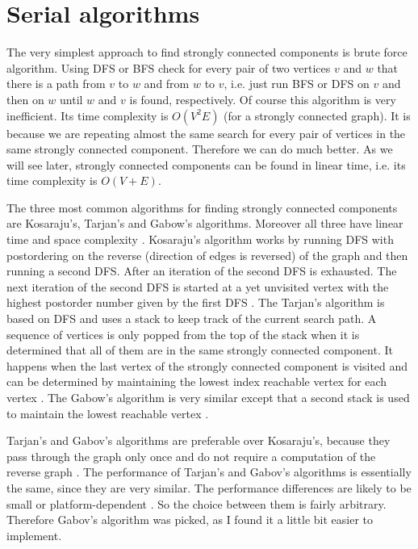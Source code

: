 \documentclass{report}
\theoremstyle{plain}
\theoremstyle{definition}
\theoremstyle{remark}
\numberwithin{definition}{chapter}
\numberwithin{example}{chapter}
\numberwithin{figure}{chapter}
\numberwithin{theorem}{chapter}
\numberwithin{lemma}{chapter}
\begin{document}
\section{Serial algorithms}

The very simplest approach to find strongly connected components is brute force algorithm. Using DFS or BFS check for every pair of two vertices $v$ and $w$ that there is a path from $v$ to $w$ and from $w$ to $v$, i.e. just run BFS or DFS on $v$ and then on $w$ until $w$ and $v$ is found, respectively. Of course this algorithm is very inefficient. Its time complexity is $O(V^2E)$ (for a strongly connected graph). It is because we are repeating almost the same search for every pair of vertices in the same strongly connected component. Therefore we can do much better. As we will see later, strongly connected components can be found in linear time, i.e. its time complexity is $O(V + E)$.

The three most common algorithms for finding strongly connected components are Kosaraju's, Tarjan's and Gabow's algorithms. Moreover all three have linear time and space complexity \cite{c++_sedgewick}. Kosaraju's algorithm works by running DFS with postordering on the reverse (direction of edges is reversed) of the graph and then running a second DFS. After an iteration of the second DFS is exhausted. The next iteration of the second DFS is started at a yet unvisited vertex with the highest postorder number given by the first DFS \cite{c++_sedgewick}. The Tarjan's algorithm is based on DFS and uses a stack to keep track of the current search path. A sequence of vertices is only popped from the top of the stack when it is determined that all of them are in the same strongly connected component. It happens when the last vertex of the strongly connected component is visited and can be determined by maintaining the lowest index  reachable vertex for each vertex \cite{c++_sedgewick}. The Gabow's algorithm is very similar except that a second stack is used to maintain the lowest reachable vertex \cite{c++_sedgewick}.

Tarjan's and Gabov's algorithms are preferable over Kosaraju's, because they pass through the graph only once and do not require a computation of the reverse graph \cite{c++_sedgewick}. The performance of Tarjan's and Gabov's algorithms is essentially the same, since they are very similar. The performance differences are likely to be small or platform-dependent \cite{Gabow2000107}. So the choice between them is fairly arbitrary. Therefore Gabov's algorithm was picked, as I found it a little bit easier to implement.
\end{document}
